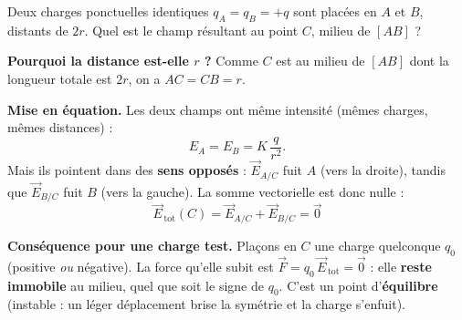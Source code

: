 \documentclass[11pt,a4paper]{article}
\newcommand{\vc}[1]{\vec{#1}}
\newcommand{\E}[2]{\vc{E}_{#1/#2}}     %
\begin{document}
\begin{exemple}
Deux charges ponctuelles identiques $q_A = q_B = +q$ sont placées en $A$ et $B$, distants de
$2r$. Quel est le champ résultant au point $C$, milieu de $[AB]$ ?

\smallskip
\begin{center}
\end{center}

\textbf{Pourquoi la distance est-elle $r$ ?} Comme $C$ est au milieu de $[AB]$ dont la longueur
totale est $2r$, on a $AC = CB = r$.

\textbf{Mise en équation.} Les deux champs ont même intensité (mêmes charges, mêmes distances) :
\[ E_A = E_B = K\,\frac{q}{r^{2}}. \]
Mais ils pointent dans des \textbf{sens opposés} : $\E{A}{C}$ fuit $A$ (vers la droite), tandis que
$\E{B}{C}$ fuit $B$ (vers la gauche). La somme vectorielle est donc nulle :
\[ \boxed{\;\vc{E}_{\,\text{tot}}(C) = \E{A}{C} + \E{B}{C} = \vc{0}\;} \]

\textbf{Conséquence pour une charge test.} Plaçons en $C$ une charge quelconque $q_0$ (positive
\emph{ou} négative). La force qu'elle subit est $\vc{F} = q_0\,\vc{E}_{\,\text{tot}} = \vc{0}$ :
elle \textbf{reste immobile} au milieu, quel que soit le signe de $q_0$. C'est un point
d'\textbf{équilibre} (instable : un léger déplacement brise la symétrie et la charge s'enfuit).
\end{exemple}
\end{document}
